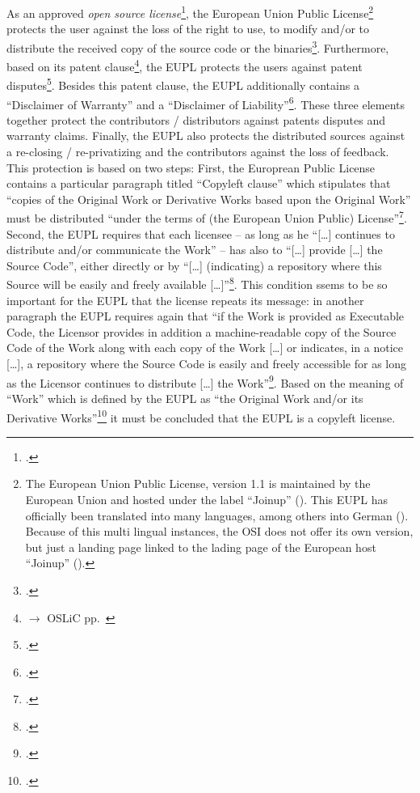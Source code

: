 As an approved \emph{open source license}\footcite[cf.][\nopage wp]{OSI2012b},
the European Union Public License\footnote{ The European Union Public License,
version 1.1 is maintained by the European Union and hosted under the label
\enquote{Joinup} (\cite[cf.][\nopage wp]{EuplLicense2007en}).
This EUPL has officially been translated into many languages, among others into
German (\cite[cf.][\nopage wp]{EuplLicense2007de}). Because of this multi
lingual instances, the OSI does not offer its own version, but just a landing
page linked to the lading page of the European host \enquote{Joinup}
(\cite[cf.][\nopage wp]{Eupl11OsiLicense2007a}).} protects the user against the
loss of the right to use, to modify and/or to distribute the received copy of
the source code or the binaries\footcite[cf.][\nopage wp\
§2]{EuplLicense2007de}. Furthermore, based on its patent
clause\footnote{$\rightarrow$ OSLiC pp.\ \pageref{subsec:EupLPatentClause}}, the
EUPL protects the users against patent disputes\footcite[cf.][\nopage wp\ §2,
at its tail]{EuplLicense2007en}. Besides this patent clause, the EUPL
additionally contains a \enquote{Disclaimer of Warranty} and a
\enquote{Disclaimer of Liability}\footcite[cf.][\nopage wp\ §7 \&
§8]{EuplLicense2007en}. These three elements together protect the contributors /
distributors against patents disputes and warranty claims. Finally, the EUPL
also protects the distributed sources against a re-closing / re-privatizing
and the contributors against the loss of feedback. This protection is based on
two steps: First, the Europrean Public License contains a particular paragraph
titled \enquote{Copyleft clause} which stipulates that \enquote{copies of the
Original Work or Derivative Works based upon the Original Work} must be
distributed \enquote{under the terms of (the European Union Public)
License}\footcite[cf.][\nopage wp\ §5]{EuplLicense2007en}. Second, the EUPL
requires that each licensee -- as long as he \enquote{[\ldots] continues to
distribute and/or communicate the Work} -- has also to \enquote{[\ldots] provide
[\ldots] the Source Code}, either directly or by \enquote{[\ldots] (indicating)
a repository where this Source will be easily and freely available
[\ldots]}\footcite[cf.][\nopage wp\ §5]{EuplLicense2007en}. This condition
ssems to be so important for the EUPL that the license repeats its message: in
another paragraph the EUPL requires again that \enquote{if the Work is provided
as Executable Code, the Licensor provides in addition a machine-readable copy of
the Source Code of the Work along with each copy of the Work [\ldots] or
indicates, in a notice [\ldots], a repository where the Source Code is easily
and freely accessible for as long as the Licensor continues to distribute
[\ldots] the Work}\footcite[cf.][\nopage wp\ §3]{EuplLicense2007en}. Based on
the meaning of \enquote{Work} which is defined by the EUPL as \enquote{the
Original Work and/or its Derivative Works}\footcite[cf.][\nopage wp\
§1]{EuplLicense2007en} it must be concluded that the EUPL is a copyleft license.

